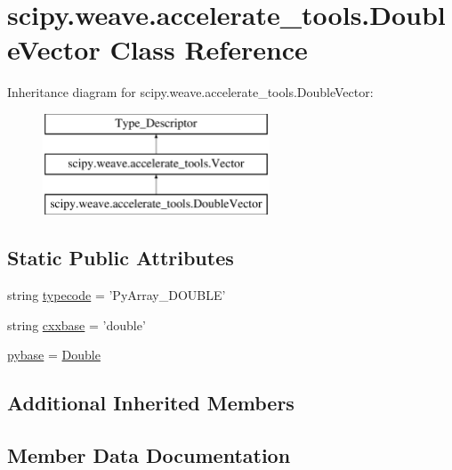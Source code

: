 \hypertarget{classscipy_1_1weave_1_1accelerate__tools_1_1DoubleVector}{}\section{scipy.\+weave.\+accelerate\+\_\+tools.\+Double\+Vector Class Reference}
\label{classscipy_1_1weave_1_1accelerate__tools_1_1DoubleVector}
Inheritance diagram for scipy.\+weave.\+accelerate\+\_\+tools.\+Double\+Vector\+:\begin{figure}[H]
\begin{center}
\leavevmode
\includegraphics[height=3.000000cm]{classscipy_1_1weave_1_1accelerate__tools_1_1DoubleVector}
\end{center}
\end{figure}
\subsection*{Static Public Attributes}
\begin{DoxyCompactItemize}
\item 
string \hyperlink{classscipy_1_1weave_1_1accelerate__tools_1_1DoubleVector_ab43eb195e28503b79570a4570136571a}{typecode} = 'Py\+Array\+\_\+\+D\+O\+U\+B\+L\+E'
\item 
string \hyperlink{classscipy_1_1weave_1_1accelerate__tools_1_1DoubleVector_a1f60bf2331ee759fd470e547eb56a5dd}{cxxbase} = 'double'
\item 
\hyperlink{classscipy_1_1weave_1_1accelerate__tools_1_1DoubleVector_acf653166b1c668abfdc189b490c6864e}{pybase} = \hyperlink{classscipy_1_1weave_1_1accelerate__tools_1_1Double}{Double}
\end{DoxyCompactItemize}
\subsection*{Additional Inherited Members}


\subsection{Member Data Documentation}
\hypertarget{classscipy_1_1weave_1_1accelerate__tools_1_1DoubleVector_a1f60bf2331ee759fd470e547eb56a5dd}{}
